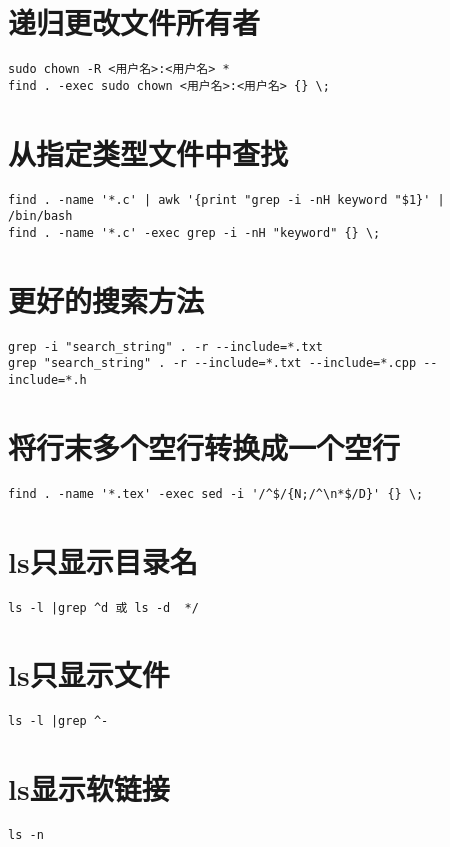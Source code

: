 \documentclass[a4paper,fontset=fandol,zihao=-4,linespread=1.2,oneside]{ctexbook}
\begin{document}
\section{递归更改文件所有者}
\begin{lstlisting}
sudo chown -R <用户名>:<用户名> *
find . -exec sudo chown <用户名>:<用户名> {} \;
\end{lstlisting}

\section{从指定类型文件中查找}
\begin{lstlisting}
find . -name '*.c' | awk '{print "grep -i -nH keyword "$1}' | /bin/bash
find . -name '*.c' -exec grep -i -nH "keyword" {} \;
\end{lstlisting}

\section{更好的搜索方法}
\begin{lstlisting}
grep -i "search_string" . -r --include=*.txt
grep "search_string" . -r --include=*.txt --include=*.cpp --include=*.h
\end{lstlisting}

\section{将行末多个空行转换成一个空行}
\begin{lstlisting}
find . -name '*.tex' -exec sed -i '/^$/{N;/^\n*$/D}' {} \;
\end{lstlisting}

\section{ls只显示目录名}
\begin{lstlisting}
ls -l |grep ^d 或 ls -d  */
\end{lstlisting}

\section{ls只显示文件}
\begin{lstlisting}
ls -l |grep ^-
\end{lstlisting}

\section{ls显示软链接}
\begin{lstlisting}
ls -n
\end{lstlisting}
\end{document}
